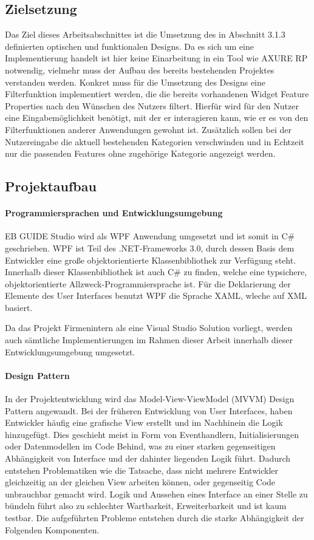 \subsection {Zielsetzung}
Das Ziel dieses Arbeitsabschnittes ist die Umsetzung des in Abschnitt 3.1.3 definierten optischen und funktionalen Designs.
Da es sich um eine Implementierung handelt ist hier keine Einarbeitung in ein Tool wie AXURE RP notwendig, vielmehr muss der Aufbau des bereits bestehenden Projektes verstanden werden.
Konkret muss für die Umsetzung des Designs eine Filterfunktion implementiert werden, die die bereits vorhandenen Widget Feature Properties nach den Wünschen des Nutzers filtert.
Hierfür wird für den Nutzer eine Eingabemöglichkeit benötigt, mit der er interagieren kann, wie er es von den Filterfunktionen anderer Anwendungen gewohnt ist.
Zusätzlich sollen bei der Nutzereingabe die aktuell bestehenden Kategorien verschwinden und in Echtzeit nur die passenden Features ohne zugehörige Kategorie angezeigt werden.

\subsection {Projektaufbau}

\paragraph{Programmiersprachen und Entwicklungsumgebung}
EB GUIDE Studio wird als WPF Anwendung umgesetzt und ist somit in C\# geschrieben.
WPF ist Teil des .NET-Frameworks 3.0, durch dessen Basis dem Entwickler eine große objektorientierte Klassenbibliothek zur Verfügung steht.
Innerhalb dieser Klassenbibliothek ist auch C\# zu finden, welche eine typsichere, objektorientierte Allzweck-Programmiersprache ist.
Für die Deklarierung der Elemente des User Interfaces benutzt WPF die Sprache XAML, wleche auf XML basiert.

Da das Projekt Firmenintern als eine Visual Studio Solution vorliegt, werden auch sämtliche Implementierungen im Rahmen dieser Arbeit innerhalb dieser Entwicklungsumgebung umgesetzt.

\paragraph{Design Pattern}
In der Projektentwicklung wird das Model-View-ViewModel (MVVM) Design Pattern angewandt.
Bei der früheren Entwicklung von User Interfaces, haben Entwickler häufig eine grafische View erstellt und im Nachhinein die Logik hinzugefügt.
Dies geschieht meist in Form von Eventhandlern, Initialisierungen oder Datenmodellen im Code Behind, was zu einer starken gegenseitigen Abhängigkeit von Interface und der dahinter liegenden Logik führt.
Dadurch entstehen Problematiken wie die Tatsache, dass nicht mehrere Entwickler gleichzeitig an der gleichen View arbeiten können, oder gegenseitig Code unbrauchbar gemacht wird.
Logik und Aussehen eines Interface an einer Stelle zu bündeln führt also zu schlechter Wartbarkeit, Erweiterbarkeit und ist kaum testbar\cite{.g}.
Die aufgeführten Probleme entstehen durch die starke Abhängigkeit der Folgenden Komponenten.


